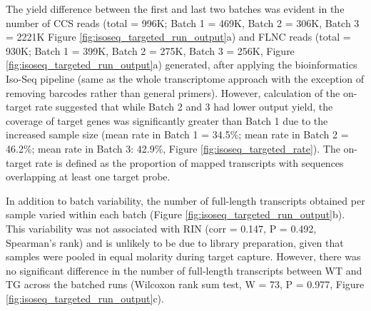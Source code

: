The yield difference between the first and last two batches was evident in the number of CCS reads (total = 996K; Batch 1 = 469K, Batch 2 = 306K, Batch 3 = 2221K Figure \ref{fig:isoseq_targeted_run_output}a) and FLNC reads (total = 930K; Batch 1 = 399K, Batch 2 = 275K, Batch 3 = 256K, Figure \ref{fig:isoseq_targeted_run_output}a) generated, after applying the bioinformatics Iso-Seq pipeline (same as the whole transcriptome approach with the exception of removing barcodes rather than general primers). However, calculation of the on-target rate suggested that while Batch 2 and 3 had lower output yield, the coverage of target genes was significantly greater than Batch 1 due to the increased sample size (mean rate in Batch 1 = 34.5\%; mean rate in Batch 2 = 46.2\%; mean rate in Batch 3: 42.9\%, Figure \ref{fig:isoseq_targeted_rate}). The on-target rate is defined as the proportion of mapped transcripts with sequences overlapping at least one target probe. 

In addition to batch variability, the number of full-length transcripts obtained per sample varied within each batch (Figure \ref{fig:isoseq_targeted_run_output}b). This variability was not associated with RIN (corr = 0.147, P = 0.492, Spearman's rank) and is unlikely to be due to library preparation, given that samples were pooled in equal molarity during target capture. However, there was no significant difference in the number of full-length transcripts between WT and TG across the batched runs (Wilcoxon rank sum test, W = 73, P = 0.977, Figure \ref{fig:isoseq_targeted_run_output}c). 

